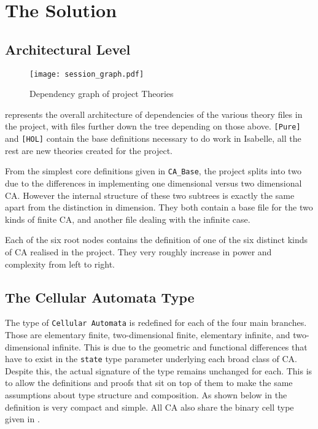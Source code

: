 \chapter{The Solution}

\section{Architectural Level}

\begin{figure}[h]
    \centering
    \texttt{[image: session\_graph.pdf]}
    \caption{Dependency graph of project Theories}
    \label{fig:graph}
\end{figure}

 represents the overall architecture of dependencies of the various theory files in the project,
with files further down the tree depending on those above.
\texttt{[Pure]} and \texttt{[HOL]} contain the base definitions necessary to do work in Isabelle,
all the rest are new theories created for the project.

From the simplest core definitions given in \texttt{CA_Base},
the project splits into two due to the differences in implementing one dimensional versus two dimensional CA.
However the internal structure of these two subtrees is exactly the same apart from the distinction in dimension.
They both contain a base file for the two kinds of finite CA,
and another file dealing with the infinite case.

Each of the six root nodes contains the definition of one of the six distinct kinds of CA realised in the project.
They very roughly increase in power and complexity from left to right.

\section{The Cellular Automata Type}

The type of \texttt{Cellular Automata} is redefined for each of the four main branches.
Those are elementary finite,
two-dimensional finite,
elementary infinite,
and two-dimensional infinite.
This is due to the geometric and functional differences that have to exist in the \texttt{state} type parameter underlying each broad class of CA.
Despite this, the actual signature of the type remains unchanged for each.
This is to allow the definitions and proofs that sit on top of them to make the same assumptions about type structure and composition.
As shown below in  the definition is very compact and simple.
All CA also share the binary cell type given in .


